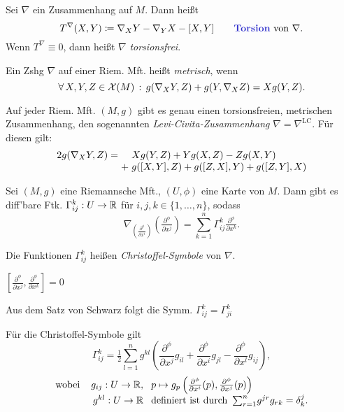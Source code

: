 \documentclass{cheat-sheet}
\newcommand{\coord}[1]{\tfrac{\partial^\phi}{\partial x^{#1}}} %
\newcommand{\Coord}[1]{\frac{\partial^\phi}{\partial x^{#1}}} %
\newcommand{\lie}[2]{\left[ {#1}, {#2} \right]} %
\newcommand{\LC}{\nabla^{\mathrm{LC}}} %
\newcommand{\VF}{\mathcal{X}} %
\begin{document}
\begin{defn}
  Sei $\nabla$ ein Zusammenhang auf $M$. Dann heißt
  \[
    T^\nabla(X, Y) \coloneqq \nabla_X Y - \nabla_Y X - [X, Y]
    \qquad \text{\emph{Torsion} von $\nabla$.}
  \]
  Wenn $T^\nabla \equiv 0$, dann heißt $\nabla$ \emph{torsionsfrei}.
\end{defn}

\begin{defn}
  Ein Zshg $\nabla$ auf einer Riem. Mft. heißt \emph{metrisch}, wenn
  \[ \fa{X, Y, Z \in \VF(M)} g(\nabla_X Y, Z) + g(Y, \nabla_X Z) = X g(Y, Z). \]
\end{defn}

\begin{lemdefn}
  Auf jeder Riem. Mft. $(M, g)$ gibt es genau einen torsionsfreien, metrischen Zusammenhang, den sogenannten \emph{Levi-Civita-Zusammenhang} $\nabla = \LC$.
  Für diesen gilt:
  \[
    \arraycolsep=1.5pt
    \begin{array}{r c l}
      2 g(\nabla_X Y, Z) = && X g(Y, Z) + Y g(X, Z) - Z g(X, Y)\\
      &+& g([X, Y], Z) + g([Z, X], Y) + g([Z, Y], X)
    \end{array}
  \]
\end{lemdefn}

\begin{bem}
  Sei $(M, g)$ eine Riemannsche Mft., $(U, \phi)$ eine Karte von $M$. Dann gibt es diff'bare Ftk. $\Gamma_{ij}^k : U \to \mathbb{R}$ für $i,j,k \in \{ 1, \ldots, n \}$, sodass
  \[
    \nabla_{\left( \coord{i} \right)} \left( \coord{j} \right) = \sum_{k=1}^n \Gamma_{ij}^k \coord{k}.
  \]
\end{bem}

\begin{defn}
  Die Funktionen $\Gamma_{ij}^k$ heißen \emph{Christoffel-Symbole} von $\nabla$.
\end{defn}


\begin{lem}
  $\lie{\coord{j}}{\coord{k}} = 0$
\end{lem}

\begin{bem}
  Aus dem Satz von Schwarz folgt die Symm. $\Gamma_{ij}^k = \Gamma_{ji}^k$
\end{bem}

\begin{satz}
  Für die Christoffel-Symbole gilt
  \[ \Gamma_{ij}^k = \tfrac{1}{2} \sum_{l=1}^n g^{kl} \left( \Coord{j} g_{il} + \Coord{i} g_{jl} - \Coord{l} g_{ij} \right), \]
  \[
    \arraycolsep=1.5pt
    \begin{array}{r r l}
      \text{wobei \enspace} & g_{ij} : U \to \R, & \enspace p \mapsto g_p \left( \coord{i} (p), \coord{j} (p) \right) \\
      & g^{kl} : U \to \R & \enspace \text{definiert ist durch} \enspace {\sum}_{r=1}^n g^{jr} g_{rk} = \delta_k^j.
    \end{array}
  \]
\end{satz}
\end{document}
